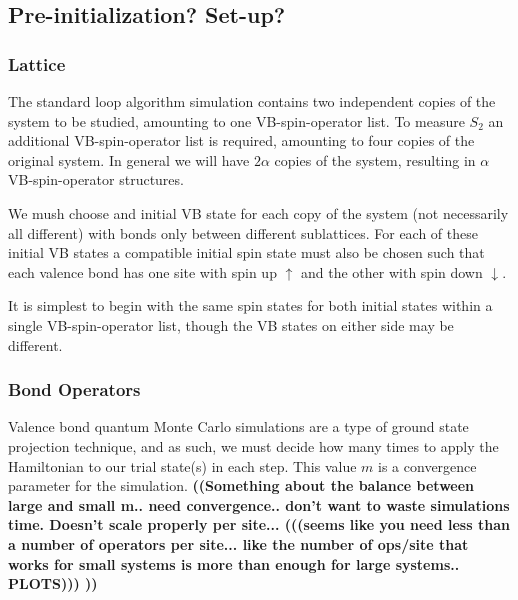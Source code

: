 \documentclass[prb,aps,twocolumn,floatfix,amsmath,amssymb,superscriptaddress,tightenlines]{revtex4}
\begin{document}
\subsection{Pre-initialization? Set-up? }
 
\subsubsection{Lattice}
	
The standard loop algorithm simulation contains two independent copies of the system to be studied, amounting to one VB-spin-operator list. 
To measure $S_2$ an additional VB-spin-operator list is required, amounting to four copies of the original system.
In general we will have $2\alpha$ copies of the system, resulting in $\alpha$ VB-spin-operator structures.
	
We mush choose and initial VB state for each copy of the system (not necessarily all different) with bonds only between different sublattices. 
For each of these initial VB states a compatible initial spin state must also be chosen such that each valence bond has one site with spin up $\uparrow$ and the other with spin down $\downarrow$.

It is simplest to begin with the same spin states for both initial states within a single VB-spin-operator list, though the VB states on either side may be different.	
	
	
\subsubsection{Bond Operators}

Valence bond quantum Monte Carlo simulations are a type of ground state projection technique, and as such, we must decide how many times to apply the Hamiltonian to our trial state(s) in each step.  
This value $m$ is a convergence parameter for the simulation.
{\bf ((Something about the balance between large and small m.. need convergence.. don't want to waste simulations time.  Doesn't scale properly per site...   (((seems like you need less than a number of operators per site... like the number of ops/site that works for small systems is more than enough for large systems.. PLOTS)))   )) }
\end{document}

